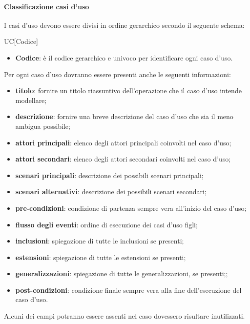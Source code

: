 			\paragraph{Classificazione casi d'uso}
I casi d'uso devono essere divisi in ordine gerarchico secondo il seguente schema: \\
				\begin{center}
					UC[Codice]
				\end{center}
				\begin{itemize}
					\item \textbf{Codice}: è il codice gerarchico e univoco per identificare ogni caso d'uso.
				\end{itemize}
			\noindent Per ogni caso d'uso dovranno essere presenti anche le seguenti informazioni:
				\begin{itemize}
					\item \textbf{titolo}: fornire un titolo riassuntivo dell'operazione che il caso d'uso intende modellare;
					\item \textbf{descrizione}: fornire una breve descrizione del caso d'uso che sia il meno ambigua possibile;
					\item \textbf{attori principali}: elenco degli attori principali coinvolti nel caso d'uso;
					\item \textbf{attori secondari}: elenco degli attori secondari coinvolti nel caso d'uso;
					\item \textbf{scenari principali}: descrizione dei possibili scenari principali;
					\item \textbf{scenari alternativi}: descrizione dei possibili scenari secondari;
					\item \textbf{pre-condizioni}: condizione di partenza sempre vera all'inizio del caso d’uso;
					\item \textbf{flusso degli eventi}: ordine di esecuzione dei casi d'uso figli;
					\item \textbf{inclusioni}: spiegazione di tutte le inclusioni se presenti;
					\item \textbf{estensioni}: spiegazione di tutte le estensioni se presenti;
					\item \textbf{generalizzazioni}: spiegazione di tutte le generalizzazioni, se presenti;;
					\item \textbf{post-condizioni}: condizione finale sempre vera alla fine dell'esecuzione del caso d'uso.
				\end{itemize}
			\noindent
			Alcuni dei campi potranno essere assenti nel caso dovessero risultare inutilizzati.
			
